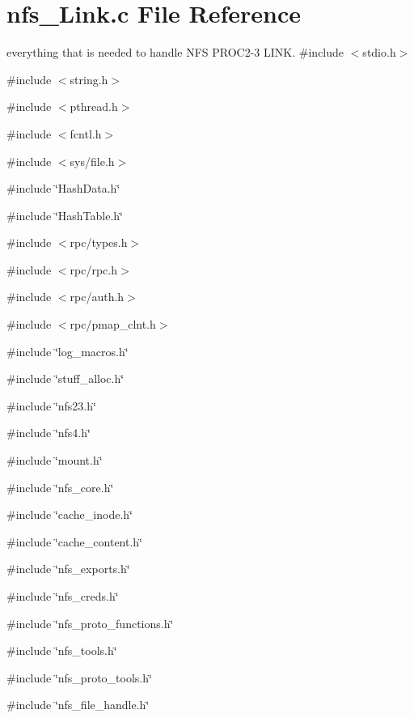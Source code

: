 \section{nfs\_\-Link.c File Reference}
\label{nfs__Link_8c}


everything that is needed to handle NFS PROC2-\/3 LINK.  
{\ttfamily \#include $<$stdio.h$>$}\par
{\ttfamily \#include $<$string.h$>$}\par
{\ttfamily \#include $<$pthread.h$>$}\par
{\ttfamily \#include $<$fcntl.h$>$}\par
{\ttfamily \#include $<$sys/file.h$>$}\par
{\ttfamily \#include \char`\"{}HashData.h\char`\"{}}\par
{\ttfamily \#include \char`\"{}HashTable.h\char`\"{}}\par
{\ttfamily \#include $<$rpc/types.h$>$}\par
{\ttfamily \#include $<$rpc/rpc.h$>$}\par
{\ttfamily \#include $<$rpc/auth.h$>$}\par
{\ttfamily \#include $<$rpc/pmap\_\-clnt.h$>$}\par
{\ttfamily \#include \char`\"{}log\_\-macros.h\char`\"{}}\par
{\ttfamily \#include \char`\"{}stuff\_\-alloc.h\char`\"{}}\par
{\ttfamily \#include \char`\"{}nfs23.h\char`\"{}}\par
{\ttfamily \#include \char`\"{}nfs4.h\char`\"{}}\par
{\ttfamily \#include \char`\"{}mount.h\char`\"{}}\par
{\ttfamily \#include \char`\"{}nfs\_\-core.h\char`\"{}}\par
{\ttfamily \#include \char`\"{}cache\_\-inode.h\char`\"{}}\par
{\ttfamily \#include \char`\"{}cache\_\-content.h\char`\"{}}\par
{\ttfamily \#include \char`\"{}nfs\_\-exports.h\char`\"{}}\par
{\ttfamily \#include \char`\"{}nfs\_\-creds.h\char`\"{}}\par
{\ttfamily \#include \char`\"{}nfs\_\-proto\_\-functions.h\char`\"{}}\par
{\ttfamily \#include \char`\"{}nfs\_\-tools.h\char`\"{}}\par
{\ttfamily \#include \char`\"{}nfs\_\-proto\_\-tools.h\char`\"{}}\par
{\ttfamily \#include \char`\"{}nfs\_\-file\_\-handle.h\char`\"{}}\par
